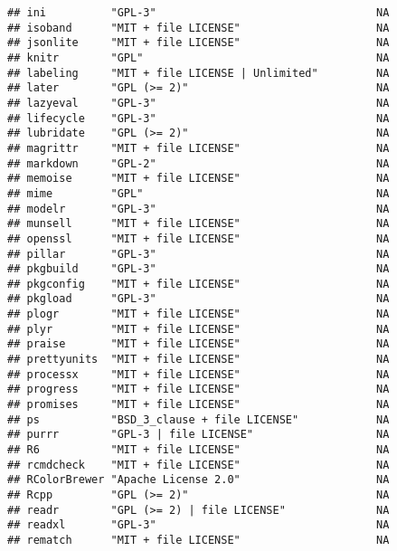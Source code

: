 \documentclass[]{book}
\begin{document}
\begin{verbatim}
## ini          "GPL-3"                                  NA             
## isoband      "MIT + file LICENSE"                     NA             
## jsonlite     "MIT + file LICENSE"                     NA             
## knitr        "GPL"                                    NA             
## labeling     "MIT + file LICENSE | Unlimited"         NA             
## later        "GPL (>= 2)"                             NA             
## lazyeval     "GPL-3"                                  NA             
## lifecycle    "GPL-3"                                  NA             
## lubridate    "GPL (>= 2)"                             NA             
## magrittr     "MIT + file LICENSE"                     NA             
## markdown     "GPL-2"                                  NA             
## memoise      "MIT + file LICENSE"                     NA             
## mime         "GPL"                                    NA             
## modelr       "GPL-3"                                  NA             
## munsell      "MIT + file LICENSE"                     NA             
## openssl      "MIT + file LICENSE"                     NA             
## pillar       "GPL-3"                                  NA             
## pkgbuild     "GPL-3"                                  NA             
## pkgconfig    "MIT + file LICENSE"                     NA             
## pkgload      "GPL-3"                                  NA             
## plogr        "MIT + file LICENSE"                     NA             
## plyr         "MIT + file LICENSE"                     NA             
## praise       "MIT + file LICENSE"                     NA             
## prettyunits  "MIT + file LICENSE"                     NA             
## processx     "MIT + file LICENSE"                     NA             
## progress     "MIT + file LICENSE"                     NA             
## promises     "MIT + file LICENSE"                     NA             
## ps           "BSD_3_clause + file LICENSE"            NA             
## purrr        "GPL-3 | file LICENSE"                   NA             
## R6           "MIT + file LICENSE"                     NA             
## rcmdcheck    "MIT + file LICENSE"                     NA             
## RColorBrewer "Apache License 2.0"                     NA             
## Rcpp         "GPL (>= 2)"                             NA             
## readr        "GPL (>= 2) | file LICENSE"              NA             
## readxl       "GPL-3"                                  NA             
## rematch      "MIT + file LICENSE"                     NA             

\end{verbatim}
\end{document}
